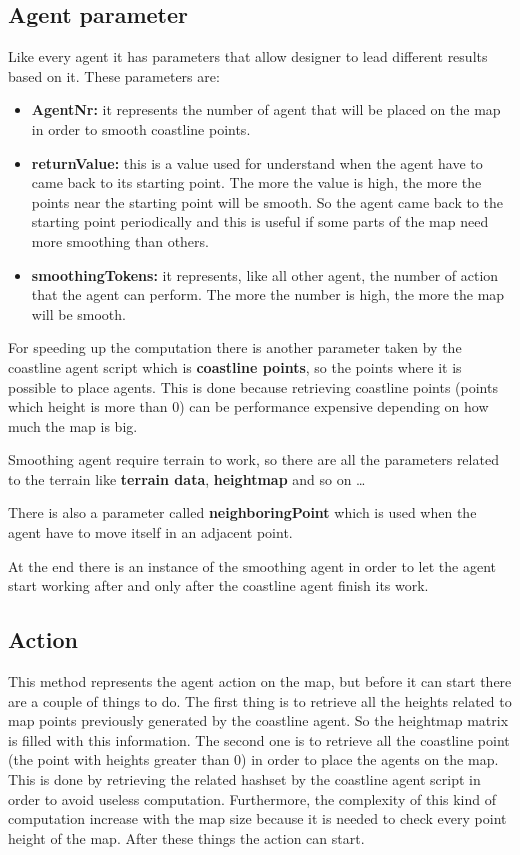 \documentclass[12pt]{article}
\begin{document}
    \subsection{Agent parameter}
    Like every agent it has parameters that allow designer to lead different results based on it.
    These parameters are:
    \begin{itemize}
        \item \textbf{AgentNr:} it represents the number of agent that will be placed on the map in order to smooth coastline points.
        \item \textbf{returnValue:} this is a value used for understand when the agent have to came back to its starting point. The more the value is high, the more
        the points near the starting point will be smooth. So the agent came back to the starting point periodically and this is useful if some parts of the map need 
        more smoothing than others.
        \item \textbf{smoothingTokens:} it represents, like all other agent, the number of action that the agent can perform. The more the number is high, the more the map will be smooth.
    \end{itemize}

    For speeding up the computation there is another parameter taken by the coastline agent script which is \textbf{coastline points}, so the points where it is possible to place agents.
    This is done because retrieving coastline points (points which height is more than 0) can be performance expensive depending on how much the map is big. 

    \noindent 
    Smoothing agent require terrain to work, so there are all the parameters related to the terrain like \textbf{terrain data}, \textbf{heightmap} and so on \dots

    \noindent
    There is also a parameter called \textbf{neighboringPoint} which is used when the agent have to move itself in an adjacent point.
    
    \noindent
    At the end there is an instance of the smoothing agent in order to let the agent start working after and only after the coastline agent finish its work.

    \subsection{Action}
    This method represents the agent action on the map, but before it can start there are a couple of things to do.
    The first thing is to retrieve all the heights related to map points previously generated by the coastline agent. So the heightmap matrix is filled with this information.
    The second one is to retrieve all the coastline point (the point with heights greater than 0) in order to place the agents on the map. This is done by retrieving the
    related hashset by the coastline agent script in order to avoid useless computation. Furthermore, the complexity of this kind of computation increase with the map size 
    because it is needed to check every point height of the map.
    After these things the action can start.
\end{document}
